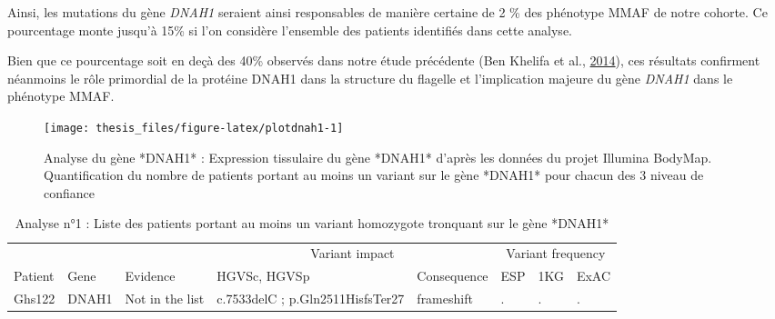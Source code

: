 \documentclass[12pt,twoside]{reedthesis}
\theoremstyle{definition}
\theoremstyle{definition}
\theoremstyle{remark}
\begin{document}
  Ainsi, les mutations du gène \emph{DNAH1} seraient ainsi responsables de
  manière certaine de 2 \% des phénotype MMAF de notre cohorte. Ce
  pourcentage monte jusqu'à 15\% si l'on considère l'ensemble des patients
  identifiés dans cette analyse.
  
  Bien que ce pourcentage soit en deçà des 40\% observés dans notre étude
  précédente (Ben Khelifa et al.,
  \protect\hyperlink{ref-BenKhelifa2014}{2014}), ces résultats confirment
  néanmoins le rôle primordial de la protéine DNAH1 dans la structure du
  flagelle et l'implication majeure du gène \emph{DNAH1} dans le phénotype
  MMAF.
  
  \newpage
  
  \begin{figure}
  
  {\centering \texttt{[image: thesis\_files/figure-latex/plotdnah1-1]} 
  
  }
  
  \caption[Analyse du gène *DNAH1*]{Analyse du gène *DNAH1* : Expression tissulaire du gène *DNAH1* d'après les données du projet Illumina BodyMap. Quantification du nombre de patients portant au moins un variant sur le gène *DNAH1* pour chacun des 3 niveau de confiance}\label{fig:plotdnah1}
  \end{figure}
  
  \newpage
  
  \begin{landscape}
  \begin{longtable}[t]{llllllll}
  \caption{\label{tab:tabdnah1high}Analyse n°1 : Liste des patients portant au moins un variant homozygote tronquant sur le gène *DNAH1*}\\
  \toprule
  \multicolumn{1}{c}{ } & \multicolumn{1}{c}{ } & \multicolumn{1}{c}{ } & \multicolumn{2}{c}{Variant impact} & \multicolumn{3}{c}{Variant frequency} \\
  \cmidrule(l{2pt}r{2pt}){4-5} \cmidrule(l{2pt}r{2pt}){6-8}
  Patient & Gene & Evidence & HGVSc, HGVSp & Consequence & ESP & 1KG & ExAC\\
  \midrule
  Ghs122 & DNAH1 & Not in the list & c.7533delC ; p.Gln2511HisfsTer27 & frameshift & . & . & .\\
  \bottomrule
  \end{longtable}
  \end{landscape}
  
\end{document}
